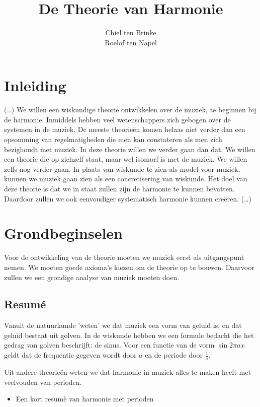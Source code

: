 \documentclass[a4paper]{article}
\author{Chiel ten Brinke \\ Roelof ten Napel}
\title{De Theorie van Harmonie}
\begin{document}
\maketitle

\section*{Inleiding}
(\ldots)
We willen een wiskundige theorie ontwikkelen over de muziek, te beginnen bij de harmonie.
Inmiddels hebben veel wetenschappers zich gebogen over de systemen in de muziek.
De meeste theorie\"en komen helaas niet verder dan een opsomming van regelmatigheden die men kan constateren als men zich bezighoudt met muziek.
In deze theorie willen we verder gaan dan dat. 
We willen een theorie die op zichzelf staat, maar wel isomorf is met de muziek.
We willen zelfs nog verder gaan.
In plaats van wiskunde te zien als model voor muziek, kunnen we muziek gaan zien als een concretisering van wiskunde.
Het doel van deze theorie is dat we in staat zullen zijn de harmonie te kunnen bevatten.
Daardoor zullen we ook eenvoudiger systematisch harmonie kunnen cre\"eren.
(\ldots)

\section*{Grondbeginselen}
Voor de ontwikkeling van de theorie moeten we muziek eerst als uitgangspunt nemen.
We moeten goede axioma's kiezen om de theorie op te bouwen.
Daarvoor zullen we een grondige analyse van muziek moeten doen.

\subsection*{Resum\'e}
Vanuit de natuurkunde 'weten' we dat muziek een vorm van geluid is, en dat geluid bestaat uit golven.
In de wiskunde hebben we een formule bedacht die het gedrag van golven beschrijft: de sinus.
Voor een functie van de vorm $\sin{2\pi a x}$ geldt dat de frequentie gegeven wordt door $a$ en de periode door $\frac{1}{a}$.

Uit andere theorie\"en weten we dat harmonie in muziek alles te maken heeft met veelvouden van perioden.
\begin{itemize}
	\item
		Een kort resum\`e van harmonie met perioden
\end{itemize}
\end{document}

